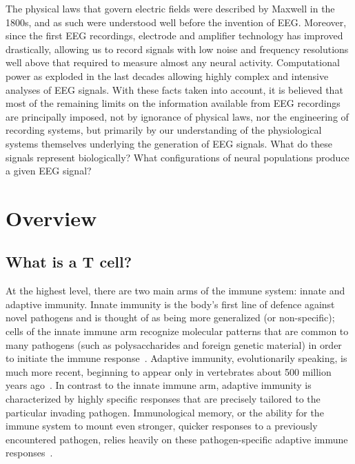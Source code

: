 The physical laws that govern electric fields were described by Maxwell in the 1800s, and as such were understood well before the invention of EEG. Moreover, since the first EEG recordings, electrode and amplifier technology has improved drastically, allowing us to record signals with low noise and frequency resolutions well above that required to measure almost any neural activity. Computational power as exploded in the last decades allowing highly complex and intensive analyses of EEG signals. With these facts taken into account, it is believed that most of the remaining limits on the information available from EEG recordings are principally imposed, not by ignorance of physical laws, nor the engineering of recording systems, but primarily by our understanding of the physiological systems themselves underlying the generation of EEG signals. What do these signals represent biologically? What configurations of neural populations produce a given EEG signal?


\section{Overview}
\label{sec:intro_overview}

\subsection{What is a T cell?}
\label{sec:intro_overview_Tcells}

At the highest level, there are two main arms of the immune system: innate and adaptive immunity. Innate immunity is the body's first line of defence against novel pathogens and is thought of as being more generalized (or non-specific); cells of the innate immune arm recognize molecular patterns that are common to many pathogens (such as polysaccharides and foreign genetic material) in order to initiate the immune response~\cite{medzhitov1997human,janeway2002innate}. Adaptive immunity, evolutionarily speaking, is much more recent, beginning to appear only in vertebrates about 500 million years ago~\cite{pancer2006evolution,redmond2018phylotranscriptomics}. In contrast to the innate immune arm, adaptive immunity is characterized by highly specific responses that are precisely tailored to the particular invading pathogen. Immunological memory, or the ability for the immune system to mount even stronger, quicker responses to a previously encountered pathogen, relies heavily on these pathogen-specific adaptive immune responses~\cite{vitetta1991memory}.

